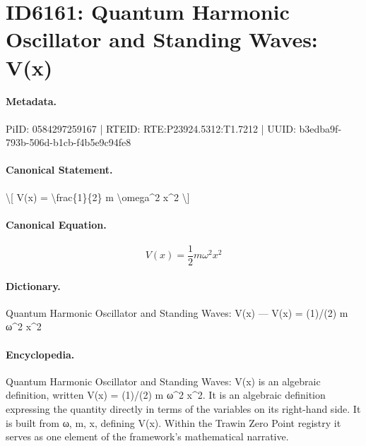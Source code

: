 \section*{ID6161: Quantum Harmonic Oscillator and Standing Waves: V(x)}
\paragraph{Metadata.}
PiID: 0584297259167 | RTEID: RTE:P23924.5312:T1.7212 | UUID: b3edba9f-793b-506d-b1cb-f4b5e9c94fe8

\paragraph{Canonical Statement.}
\textbackslash{}[ V(x) = \textbackslash{}frac\{1\}\{2\} m \textbackslash{}omega\textasciicircum{}2 x\textasciicircum{}2 \textbackslash{}]

\paragraph{Canonical Equation.}
\[
V(x) = \frac{1}{2} m \omega^2 x^2
\]

\paragraph{Dictionary.}
Quantum Harmonic Oscillator and Standing Waves: V(x) — V(x) = (1)/(2) m ω\textasciicircum{}2 x\textasciicircum{}2

\paragraph{Encyclopedia.}
Quantum Harmonic Oscillator and Standing Waves: V(x) is an algebraic definition, written V(x) = (1)/(2) m ω\textasciicircum{}2 x\textasciicircum{}2. It is an algebraic definition expressing the quantity directly in terms of the variables on its right-hand side. It is built from ω, m, x, defining V(x). Within the Trawin Zero Point registry it serves as one element of the framework's mathematical narrative.
